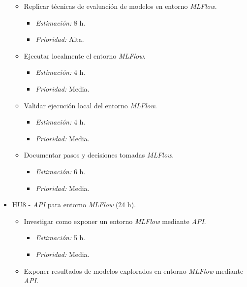\documentclass[
11pt, %
]{charter}
\begin{document}
\begin{itemize}
\begin{itemize}
            \item Replicar técnicas de evaluación de modelos en entorno \textit{MLFlow}.
                \begin{itemize}
                    \item \textit{Estimación:} 8 h.
                    \item \textit{Prioridad:} Alta.
                \end{itemize}
            \item Ejecutar localmente el entorno \textit{MLFlow}.
                \begin{itemize}
                    \item \textit{Estimación:} 4 h.
                    \item \textit{Prioridad:} Media.
                \end{itemize}
            \item Validar ejecución local del entorno \textit{MLFlow}.
                \begin{itemize}
                    \item \textit{Estimación:} 4 h.
                    \item \textit{Prioridad:} Media.
                \end{itemize}
            \item Documentar pasos y decisiones tomadas \textit{MLFlow}.
                \begin{itemize}
                    \item \textit{Estimación:} 6 h.
                    \item \textit{Prioridad:} Media.
                \end{itemize}
        \end{itemize}
    \item HU8 - \textit{API} para entorno \textit{MLFlow} (24 h).
        \begin{itemize}
            \item Investigar como exponer un entorno \textit{MLFlow} mediante \textit{API}.
                \begin{itemize}
                    \item \textit{Estimación:} 5 h.
                    \item \textit{Prioridad:} Media.
                \end{itemize}
            \item Exponer resultados de modelos explorados en entorno \textit{MLFlow} mediante \textit{API}.

\end{itemize}
\end{itemize}
\end{document}
